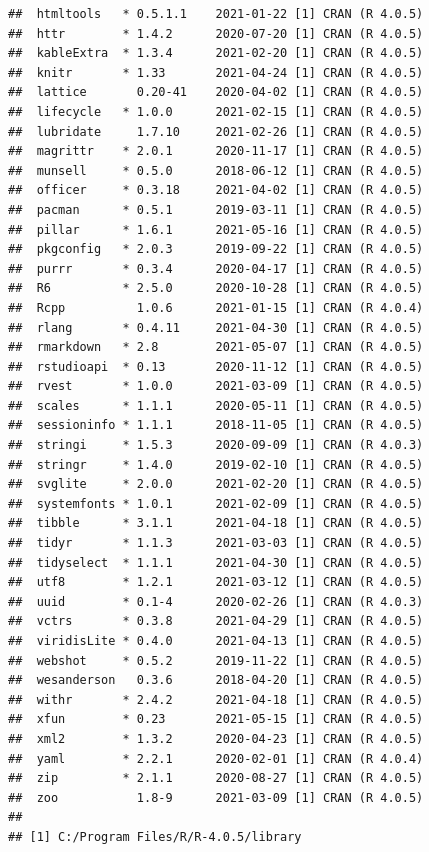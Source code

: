 \documentclass[
  11pt,
]{article}
\begin{document}
\begin{verbatim}
##  htmltools   * 0.5.1.1    2021-01-22 [1] CRAN (R 4.0.5)                     
##  httr        * 1.4.2      2020-07-20 [1] CRAN (R 4.0.5)                     
##  kableExtra  * 1.3.4      2021-02-20 [1] CRAN (R 4.0.5)                     
##  knitr       * 1.33       2021-04-24 [1] CRAN (R 4.0.5)                     
##  lattice       0.20-41    2020-04-02 [1] CRAN (R 4.0.5)                     
##  lifecycle   * 1.0.0      2021-02-15 [1] CRAN (R 4.0.5)                     
##  lubridate     1.7.10     2021-02-26 [1] CRAN (R 4.0.5)                     
##  magrittr    * 2.0.1      2020-11-17 [1] CRAN (R 4.0.5)                     
##  munsell     * 0.5.0      2018-06-12 [1] CRAN (R 4.0.5)                     
##  officer     * 0.3.18     2021-04-02 [1] CRAN (R 4.0.5)                     
##  pacman      * 0.5.1      2019-03-11 [1] CRAN (R 4.0.5)                     
##  pillar      * 1.6.1      2021-05-16 [1] CRAN (R 4.0.5)                     
##  pkgconfig   * 2.0.3      2019-09-22 [1] CRAN (R 4.0.5)                     
##  purrr       * 0.3.4      2020-04-17 [1] CRAN (R 4.0.5)                     
##  R6          * 2.5.0      2020-10-28 [1] CRAN (R 4.0.5)                     
##  Rcpp          1.0.6      2021-01-15 [1] CRAN (R 4.0.4)                     
##  rlang       * 0.4.11     2021-04-30 [1] CRAN (R 4.0.5)                     
##  rmarkdown   * 2.8        2021-05-07 [1] CRAN (R 4.0.5)                     
##  rstudioapi  * 0.13       2020-11-12 [1] CRAN (R 4.0.5)                     
##  rvest       * 1.0.0      2021-03-09 [1] CRAN (R 4.0.5)                     
##  scales      * 1.1.1      2020-05-11 [1] CRAN (R 4.0.5)                     
##  sessioninfo * 1.1.1      2018-11-05 [1] CRAN (R 4.0.5)                     
##  stringi     * 1.5.3      2020-09-09 [1] CRAN (R 4.0.3)                     
##  stringr     * 1.4.0      2019-02-10 [1] CRAN (R 4.0.5)                     
##  svglite     * 2.0.0      2021-02-20 [1] CRAN (R 4.0.5)                     
##  systemfonts * 1.0.1      2021-02-09 [1] CRAN (R 4.0.5)                     
##  tibble      * 3.1.1      2021-04-18 [1] CRAN (R 4.0.5)                     
##  tidyr       * 1.1.3      2021-03-03 [1] CRAN (R 4.0.5)                     
##  tidyselect  * 1.1.1      2021-04-30 [1] CRAN (R 4.0.5)                     
##  utf8        * 1.2.1      2021-03-12 [1] CRAN (R 4.0.5)                     
##  uuid        * 0.1-4      2020-02-26 [1] CRAN (R 4.0.3)                     
##  vctrs       * 0.3.8      2021-04-29 [1] CRAN (R 4.0.5)                     
##  viridisLite * 0.4.0      2021-04-13 [1] CRAN (R 4.0.5)                     
##  webshot     * 0.5.2      2019-11-22 [1] CRAN (R 4.0.5)                     
##  wesanderson   0.3.6      2018-04-20 [1] CRAN (R 4.0.5)                     
##  withr       * 2.4.2      2021-04-18 [1] CRAN (R 4.0.5)                     
##  xfun        * 0.23       2021-05-15 [1] CRAN (R 4.0.5)                     
##  xml2        * 1.3.2      2020-04-23 [1] CRAN (R 4.0.5)                     
##  yaml        * 2.2.1      2020-02-01 [1] CRAN (R 4.0.4)                     
##  zip         * 2.1.1      2020-08-27 [1] CRAN (R 4.0.5)                     
##  zoo           1.8-9      2021-03-09 [1] CRAN (R 4.0.5)                     
## 
## [1] C:/Program Files/R/R-4.0.5/library
\end{verbatim}
\end{document}
